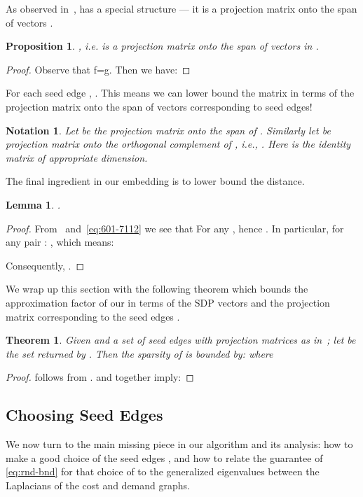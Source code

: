 \documentclass{article}
\newtheorem{theorem}{Theorem}[section]
\newtheorem{lemma}{Lemma}[section]
\newtheorem{proposition}{Proposition}[section]
\newtheorem{notation}{Notation}[section]
\newcounter{alg-count}
\def\ngap{}
\begin{document}
As observed in~\cite{gs11-qip}, 
 has a special structure --- it is a projection matrix
onto the span of vectors . 
\begin{proposition}\label{lem:pi-is-proj}
  , i.e.  is a projection matrix onto
  the span of vectors in .
\end{proposition}
\begin{proof}
Observe that 
f=g. 
Then we have:
 
\end{proof}
For each seed edge ,
.
This means we can lower bound the matrix  in terms of the
projection matrix onto the span of vectors corresponding to seed
edges!
\begin{notation}
\label{not:proj-mtx}
Let  be the projection matrix onto the span of . Similarly let  be
projection matrix onto the orthogonal complement of , i.e., . Here  is the identity matrix of appropriate dimension.
\end{notation}
The final ingredient in our embedding is to lower bound the 
distance.
\begin{lemma} \label{lem:l1-lb} .
\end{lemma}
\begin{proof}
  From~ and~\cref{eq:601-7112} we see that  For any ,  hence . In particular, for any pair :
  , which means:
  
  Consequently, . \qedhere
\end{proof}
We wrap up this section with the following theorem which bounds the
approximation factor of our  in terms of the SDP
vectors  and the projection matrix  corresponding
to the seed edges .
\newcommand{\scsdp}{\Phi^{\mathrm{SDP}}}
\begin{theorem}\label{thm:rnd-from-s}
  Given  and a set of seed edges  with projection matrices  as in~; let  be the
  set returned by .
Then the sparsity  of  is bounded by:
   where
  
\end{theorem}
\begin{proof}
   follows from .
 and  together imply:

\end{proof}
\ngap
\subsection{Choosing Seed Edges}
\label{sec:seed-selection}

We now turn to the main missing piece in our algorithm and its
analysis: how to make a good choice of the seed edges , and how
to relate the guarantee of \cref{eq:rnd-bnd} for that choice of 
to the generalized eigenvalues between the Laplacians of the cost and
demand graphs.
\end{document}
